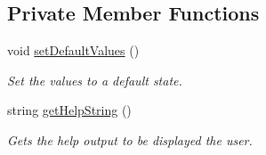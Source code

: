 \subsection*{Private Member Functions}
\begin{DoxyCompactItemize}
\item 
\hypertarget{classcommand_1_1_parameter_parser_a2833fc94c1688934898c7b079684d45a}{
void \hyperlink{classcommand_1_1_parameter_parser_a2833fc94c1688934898c7b079684d45a}{setDefaultValues} ()}
\label{classcommand_1_1_parameter_parser_a2833fc94c1688934898c7b079684d45a}

\begin{DoxyCompactList}\small\item\em Set the values to a default state. \item\end{DoxyCompactList}\item 
string \hyperlink{classcommand_1_1_parameter_parser_a7a1cce7b6754b4ce4aba2540f01b40bb}{getHelpString} ()
\begin{DoxyCompactList}\small\item\em Gets the help output to be displayed the user. \item\end{DoxyCompactList}\end{DoxyCompactItemize}

